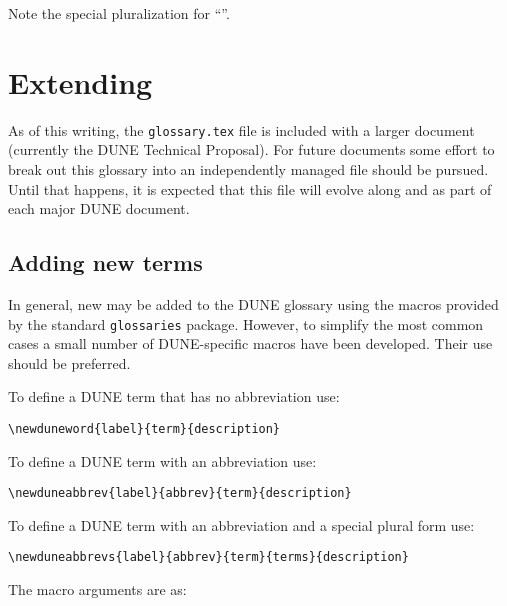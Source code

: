 \documentclass{article}
\begin{document}
\noindent Note the special pluralization for ``''.

\section{Extending}

As of this writing, the \texttt{glossary.tex} file is included with a
larger document (currently the DUNE Technical Proposal). 
For future documents some effort to break out this glossary into an
independently managed file should be pursued. 
Until that happens, it is expected that this file will evolve along
and as part of each major DUNE document.

\subsection{Adding new terms}

In general, new  may be added to the DUNE glossary using
the macros provided by the standard \texttt{glossaries} package. 
However, to simplify the most common cases a small number of
DUNE-specific macros have been developed. 
Their use should be preferred.

 To define a DUNE term that has no abbreviation use:

\begin{verbatim}
\newduneword{label}{term}{description}
\end{verbatim}

 To define a DUNE term with an abbreviation use:

\begin{verbatim}
\newduneabbrev{label}{abbrev}{term}{description}
\end{verbatim}

 To define a DUNE term with an abbreviation and a special plural form use:

\begin{verbatim}
\newduneabbrevs{label}{abbrev}{term}{terms}{description}
\end{verbatim}

 The macro arguments are as:
\end{document}
